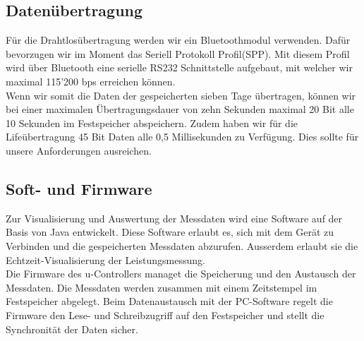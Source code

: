 \documentclass[12pt,a4paper]{article}
\begin{document}
\subsection{Datenübertragung}
Für die Drahtlosübertragung werden wir ein Bluetoothmodul verwenden. Dafür bevorzugen wir im Moment das \glqq Seriell Protokoll Profil\grqq(SPP). Mit diesem Profil wird über Bluetooth eine serielle RS232 Schnittstelle aufgebaut, mit welcher wir maximal 115'200 bps erreichen können.\\ 
Wenn wir somit die Daten der gespeicherten sieben Tage übertragen, können wir bei einer maximalen Übertragungsdauer von zehn Sekunden maximal 20 Bit alle 10 Sekunden im Festspeicher abspeichern. Zudem haben wir für die Lifeübertragung 45 Bit Daten alle 0,5 Millisekunden zu Verfügung. Dies sollte für unsere Anforderungen ausreichen.




\subsection{Soft- und Firmware}
Zur Visualisierung und Auswertung der Messdaten wird eine Software auf der Basis von Java entwickelt. Diese Software erlaubt es, sich mit dem Gerät zu Verbinden und die gespeicherten Messdaten abzurufen. Ausserdem erlaubt sie die Echtzeit-Visualisierung der Leistungsmessung. 
\\
Die Firmware des u-Controllers managet die Speicherung und den Austausch der Messdaten. Die Messdaten werden zusammen mit einem Zeitstempel im Festspeicher abgelegt. Beim Datenaustausch mit der PC-Software regelt die Firmware den Lese- und Schreibzugriff auf den Festspeicher und stellt die Synchronität der Daten sicher. 
\end{document}
